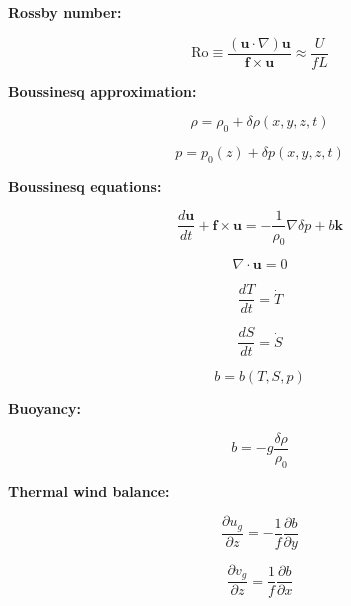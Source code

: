 \documentclass[12pt]{article}
\numberwithin{equation}{section}
\numberwithin{figure}{section}
\numberwithin{table}{section}
\begin{document}
\textbf{Rossby number:}

\begin{equation}
  \text{Ro} \equiv \frac{\left( \mathbf{u} \cdot \nabla \right) \mathbf{u}}{\mathbf{f} \times \mathbf{u}} \approx \frac{U}{fL}
\end{equation}

\textbf{Boussinesq approximation:}

\begin{equation}
  \rho = \rho_0 + \delta \rho(x, y, z, t)
\end{equation}

\begin{equation}
  p = p_0(z) + \delta p(x, y, z, t)
\end{equation}

\textbf{Boussinesq equations:}

\begin{equation}
  \frac{d \mathbf{u}}{dt} + \mathbf{f} \times \mathbf{u} =
  - \frac{1}{\rho_0} \nabla \delta p + b \mathbf{k}
\end{equation}

\begin{equation}
  \nabla \cdot \mathbf{u} = 0
\end{equation}

\begin{equation}
  \frac{d T}{dt} = \dot{T}
\end{equation}

\begin{equation}
  \frac{d S}{dt} = \dot{S}
\end{equation}

\begin{equation}
  b = b(T, S, p)
\end{equation}

\textbf{Buoyancy:}

\begin{equation}
  b = - g \frac{\delta \rho}{\rho_0}
\end{equation}

\textbf{Thermal wind balance:}

\begin{equation}
  \frac{\partial u_g}{\partial z} = - \frac{1}{f} \frac{\partial b}{\partial y}
\end{equation}

\begin{equation}
  \frac{\partial v_g}{\partial z} = \frac{1}{f} \frac{\partial b}{\partial x}
\end{equation}
\end{document}
